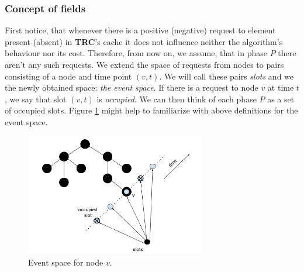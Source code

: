 \subsubsection{Concept of fields}
First notice, that whenever there is a positive (negative) request to element 
present (absent) in \textbf{TRC}'s cache it does not influence neither the 
algorithm's behaviour nor its cost. Therefore, from now on, we assume, that in
phase $P$ there aren't any such requests. We extend the space of requests from nodes to pairs
consisting of a node and time point $(v, t)$. We will call these pairs \textit{slots} and we 
the newly obtained space: \textit{the event space}. If there is a request to node $v$ at time
$t$, we say that slot $(v, t)$ is \textit{occupied}. We can then think of each phase $P$ as
a set of occupied slots. Figure \ref{fig:spacial_temporal} might help to familiarize with
above definitions for the event space.
\begin{figure}
 \begin{center}
  \includegraphics[width=0.7\textwidth]{spacial_temporal.png}
 \end{center}
 \caption{Event space for node $v$.}
 \label{fig:spacial_temporal}
\end{figure}

